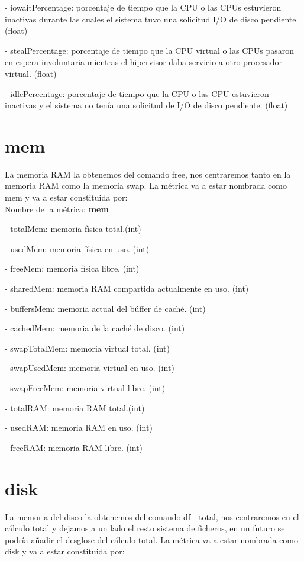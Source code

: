 \documentclass[ spanish, a4paper, 12pt, twoside]{report}
\begin{document}
\hyp{} iowaitPercentage: porcentaje de tiempo que la CPU o las CPUs estuvieron inactivas durante las cuales el sistema tuvo una solicitud I/O de disco pendiente. (float)

\hyp{} stealPercentage: porcentaje de tiempo que la CPU virtual o las CPUs pasaron en espera involuntaria mientras el hipervisor daba servicio a otro procesador virtual. (float)

\hyp{} idlePercentage: porcentaje de tiempo que la CPU o las CPU estuvieron inactivas y el sistema no tenía una solicitud de I/O de disco pendiente. (float)

\section{mem}
La memoria RAM la obtenemos del comando free, nos centraremos tanto en la memoria RAM
como la memoria swap. La métrica va a estar nombrada como mem y va a estar constituida por:\\

Nombre de la métrica: \textbf{mem}

\hyp{} totalMem: memoria física total.(int)

\hyp{} usedMem: memoria física en uso. (int)

\hyp{} freeMem: memoria física libre. (int)

\hyp{} sharedMem: memoria RAM compartida actualmente en uso. (int)

\hyp{} buffersMem: memoria actual del búffer de caché. (int)

\hyp{} cachedMem: memoria de la caché de disco. (int)

\hyp{} swapTotalMem: memoria virtual total. (int)

\hyp{} swapUsedMem: memoria virtual en uso. (int)

\hyp{} swapFreeMem: memoria virtual libre. (int)

\hyp{} totalRAM: memoria RAM total.(int)

\hyp{} usedRAM: memoria RAM en uso. (int)

\hyp{} freeRAM: memoria RAM libre. (int)

\section{disk}
La memoria del disco la obtenemos del comando df \hyp{}\hyp{}total, nos centraremos en el cálculo total y dejamos a un lado el resto 
sistema de ficheros, en un futuro se podría añadir el desglose del cálculo total. La métrica va a estar nombrada como disk
y va a estar constituida por:\\
 
\end{document}
